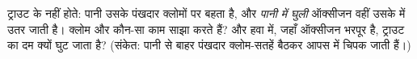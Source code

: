 \begin{exercise}[$\star\star\star$]\label{exo:g4:breathing:11}
ट्राउट के  नहीं होते: पानी उसके पंखदार क्लोमों पर बहता है, और
\emph{पानी में घुली} ऑक्सीजन वहीं उसके  में उतर जाती है। क्लोम और
 कौन-सा काम साझा करते हैं? और हवा में, जहाँ ऑक्सीजन भरपूर है,
ट्राउट का दम क्यों घुट जाता है? (संकेत: पानी से बाहर पंखदार क्लोम-सतहें
बैठकर आपस में चिपक जाती हैं।)
\end{exercise}

